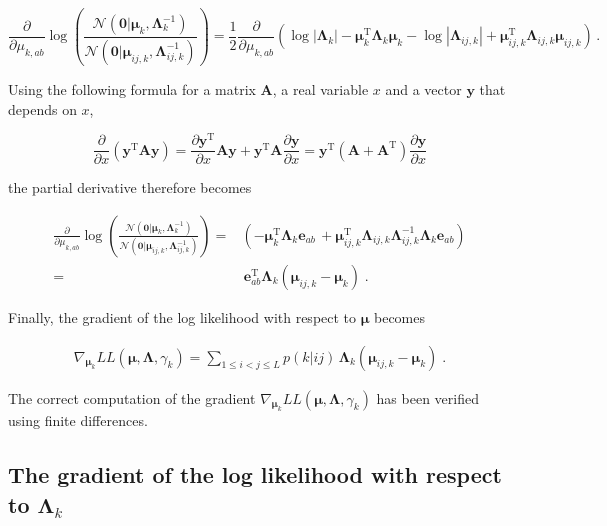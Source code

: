 \documentclass[11pt,a4paper,twoside]{book}
\newcommand{\Gauss}{\mathcal{N}}
\newcommand{\Lijk}{\mathbf{\Lambda}_{ij,k}}
\newcommand{\Lk}{\mathbf{\Lambda}_k}
\newcommand{\muijk}{\mathbf{\mu}_{ij,k}}
\newcommand{\muk}{\mathbf{\mu}_k}
\theoremstyle{definition}
\theoremstyle{definition}
\theoremstyle{remark}
\begin{document}
\begin{equation}
     \frac{\partial}{\partial \mu_{k,ab}} \log \left( \frac{ \Gauss(\mathbf{0} | \muk, \Lk^{-1})}{\Gauss( \mathbf{0} | \muijk, \Lijk^{-1})} \right)
    = \frac{1}{2}  \frac{\partial}{\partial \mu_{k,ab}}   \left( \log | \Lk | - \muk^\mathrm{T} \Lk \muk - \log | \Lijk | + \muijk^\mathrm{T} \Lijk \muijk \right)\,.
\end{equation}

Using the following formula for a matrix \(\mathbf{A}\), a real variable
\(x\) and a vector \(\mathbf{y}\) that depends on \(x\),

\begin{equation}
    \frac{\partial}{\partial x} \left( \mathbf{y}^\mathrm{T} \mathbf{A} \mathbf{y} \right) = \frac{\partial \mathbf{y}^\mathrm{T}}{\partial x}  \mathbf{A} \mathbf{y} + \mathbf{y}^\mathrm{T} \mathbf{A} \frac{\partial \mathbf{y}}{\partial x}  =  \mathbf{y}^\mathrm{T} (\mathbf{A} + \mathbf{A}^\mathrm{T}) \frac{\partial \mathbf{y}}{\partial x} 
\label{eq:matrix-gradient}
\end{equation}

the partial derivative therefore becomes

\begin{align}
     \frac{\partial}{\partial \mu_{k,ab}} \log \left( \frac{ \Gauss(\mathbf{0} | \muk, \Lk^{-1})}{\Gauss( \mathbf{0} | \muijk, \Lijk^{-1})} \right)
    =& \left( -\muk^\mathrm{T} \Lk \mathbf{e}_{ab} \, +  \muijk^\mathrm{T} \Lijk \Lijk^{-1} \Lk \mathbf{e}_{ab} \right) \nonumber \\
    =& \, \mathbf{e}^\mathrm{T}_{ab} \Lk ( \muijk - \muk ) \; . 
\end{align}

Finally, the gradient of the log likelihood with respect to
\(\mathbf{\mu}\) becomes

\begin{align}
    \nabla_{\muk} L\!L(\mathbf{\mu}, \mathbf{\Lambda}, \gamma_k) =  \sum_{1\le i<j\le L}  p(k|ij)  \,  \Lk \left(  \muijk  - \muk \right) \; .
\label{eq:gradient-muk-final}
\end{align}

The correct computation of the gradient
\(\nabla_{\muk} L\!L(\mathbf{\mu}, \mathbf{\Lambda}, \gamma_k)\) has
been verified using finite differences.

\subsection{\texorpdfstring{The gradient of the log likelihood with
respect to
\(\Lk\)}{The gradient of the log likelihood with respect to \textbackslash{}Lk}}\label{gradient-lambdak}
\end{document}
